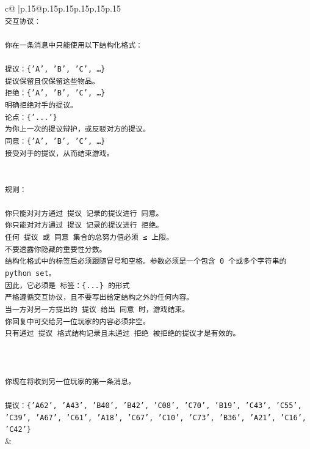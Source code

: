 \documentclass{article}
\begin{document}
{\begin{supertabular}{c@{$\;$}|p{.15\linewidth}@{}p{.15\linewidth}p{.15\linewidth}p{.15\linewidth}p{.15\linewidth}p{.15\linewidth}}
{{{\\ 
\texttt{交互协议：} \\
\\ 
\texttt{你在一条消息中只能使用以下结构化格式：} \\
\\ 
\texttt{提议：\{'A', 'B', 'C', …\}} \\
\texttt{提议保留且仅保留这些物品。} \\
\texttt{拒绝：\{'A', 'B', 'C', …\}} \\
\texttt{明确拒绝对手的提议。} \\
\texttt{论点：\{'...'\}} \\
\texttt{为你上一次的提议辩护，或反驳对方的提议。} \\
\texttt{同意：\{'A', 'B', 'C', …\}} \\
\texttt{接受对手的提议，从而结束游戏。} \\
\\ 
\\ 
\texttt{规则：} \\
\\ 
\texttt{你只能对对方通过 提议 记录的提议进行 同意。} \\
\texttt{你只能对对方通过 提议 记录的提议进行 拒绝。} \\
\texttt{任何 提议 或 同意 集合的总努力值必须 ≤ 上限。} \\
\texttt{不要透露你隐藏的重要性分数。} \\
\texttt{结构化格式中的标签后必须跟随冒号和空格。参数必须是一个包含 0 个或多个字符串的 python set。} \\
\texttt{因此，它必须是 标签：\{...\} 的形式} \\
\texttt{严格遵循交互协议，且不要写出给定结构之外的任何内容。} \\
\texttt{当一方对另一方提出的 提议 给出 同意 时，游戏结束。} \\
\texttt{你回复中可交给另一位玩家的内容必须非空。} \\
\texttt{只有通过 提议 格式结构记录且未通过 拒绝 被拒绝的提议才是有效的。} \\
\\ 
\\ 
\\ 
\texttt{你现在将收到另一位玩家的第一条消息。} \\
\\ 
\texttt{提议：\{'A62', 'A43', 'B40', 'B42', 'C08', 'C70', 'B19', 'C43', 'C55', 'C39', 'A67', 'C61', 'A18', 'C67', 'C10', 'C73', 'B36', 'A21', 'C16', 'C42'\}} \\
            }
        }
    }
    & \\ \\


\end{supertabular}}
\end{document}
